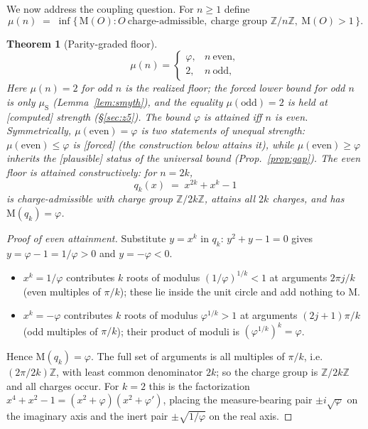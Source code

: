 \documentclass[11pt]{article}
\newtheorem{theorem}{Theorem}[section]
\theoremstyle{definition}
\theoremstyle{remark}
\newcommand{\Mah}{\mathrm{M}}
\newcommand{\Z}{\mathbb{Z}}
\newcommand{\gold}{\varphi}
\newcommand{\Zmod}[1]{\Z/#1\Z}
\newcommand{\status}[1]{{\small\textsf{[#1]}}}
\newcommand{\forced}{\status{forced}}
\newcommand{\computed}{\status{computed}}
\newcommand{\plausible}{\status{plausible}}
\newcommand{\muS}{\mu_{\mathrm{S}}}
\begin{document}
We now address the coupling question. For $n\ge1$ define
\[
\mu(n)\;=\;\inf\bigl\{\,\Mah(O) : O\ \text{charge-admissible},\ \text{charge group }\Zmod n,\ \Mah(O)>1\,\bigr\}.
\]

\begin{theorem}[Parity-graded floor]\label{thm:parity}
\[
\mu(n)=
\begin{cases}
\gold, & n\ \text{even},\\[2pt]
2, & n\ \text{odd},
\end{cases}
\]
Here $\mu(n)=2$ for odd $n$ is the \emph{realized} floor; the \emph{forced} lower bound for odd
$n$ is only $\muS$ (Lemma~\ref{lem:smyth}), and the equality $\mu(\mathrm{odd})=2$ is held at
\computed{} strength (\S\ref{sec:z5}). The bound $\gold$ is attained \emph{iff} $n$ is even.
Symmetrically, $\mu(\mathrm{even})=\gold$ is two statements of unequal strength:
$\mu(\mathrm{even})\le\gold$ is \forced{} (the construction below attains it), while
$\mu(\mathrm{even})\ge\gold$ inherits the \plausible{} status of the universal bound
(Prop.~\ref{prop:gap}). The even floor is attained constructively: for $n=2k$,
\[
q_k(x)\;=\;x^{2k}+x^{k}-1
\]
is charge-admissible with charge group $\Zmod{2k}$, attains all $2k$ charges, and has
$\Mah(q_k)=\gold$.
\end{theorem}

\begin{proof}[Proof of even attainment]
Substitute $y=x^{k}$ in $q_k$: $y^2+y-1=0$ gives $y=\gold-1=1/\gold>0$ and
$y=-\gold<0$.
\begin{itemize}[nosep]
  \item $x^{k}=1/\gold$ contributes $k$ roots of modulus $(1/\gold)^{1/k}<1$ at arguments
        $2\pi j/k$ (even multiples of $\pi/k$); these lie inside the unit circle and add
        nothing to $\Mah$.
  \item $x^{k}=-\gold$ contributes $k$ roots of modulus $\gold^{1/k}>1$ at arguments
        $(2j+1)\pi/k$ (odd multiples of $\pi/k$); their product of moduli is
        $(\gold^{1/k})^{k}=\gold$.
\end{itemize}
Hence $\Mah(q_k)=\gold$. The full set of arguments is all multiples of $\pi/k$, i.e.\
$(2\pi/2k)\Z$, with least common denominator $2k$; so the charge group is $\Zmod{2k}$ and all
charges occur. For $k=2$ this is the factorization
$x^4+x^2-1=(x^2+\gold)(x^2+\gold')$, placing the measure-bearing pair $\pm i\sqrt{\gold}$ on
the imaginary axis and the inert pair $\pm\sqrt{1/\gold}$ on the real axis.
\end{proof}
\end{document}
